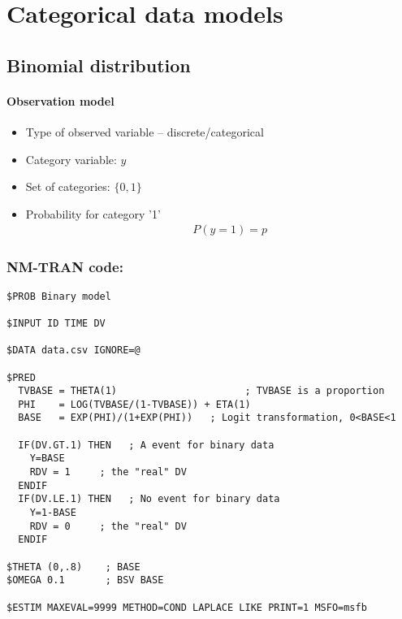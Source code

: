\section{Categorical data models}
\label{subsec:categoricalDataModels}


\subsection{Binomial distribution}

\paragraph{Observation model}
	
\begin{itemize}
\item
Type of observed variable -- discrete/categorical
\item
Category variable: $y$
\item
Set of categories: $\{0,1\}$
\item
Probability for category '1'
\begin{eqnarray}
&& P(y=1) = p \nonumber
\end{eqnarray}
\end{itemize}


\subsubsection{NM-TRAN code:}
\myStartLine
\lstset{language=NONMEMdataSet}
\begin{lstlisting}
$PROB Binary model

$INPUT ID TIME DV

$DATA data.csv IGNORE=@ 

$PRED
  TVBASE = THETA(1)                      ; TVBASE is a proportion
  PHI    = LOG(TVBASE/(1-TVBASE)) + ETA(1)  
  BASE   = EXP(PHI)/(1+EXP(PHI))   ; Logit transformation, 0<BASE<1

  IF(DV.GT.1) THEN   ; A event for binary data
    Y=BASE
    RDV = 1     ; the "real" DV
  ENDIF
  IF(DV.LE.1) THEN   ; No event for binary data
    Y=1-BASE
    RDV = 0     ; the "real" DV
  ENDIF

$THETA (0,.8)    ; BASE
$OMEGA 0.1       ; BSV BASE

$ESTIM MAXEVAL=9999 METHOD=COND LAPLACE LIKE PRINT=1 MSFO=msfb
\end{lstlisting}
\myEndLine

